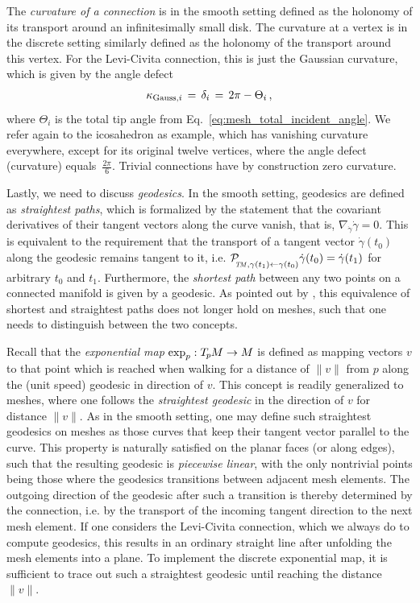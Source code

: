 The \emph{curvature of a connection} is in the smooth setting defined as the holonomy of its transport around an infinitesimally small disk.
The curvature at a vertex is in the discrete setting similarly defined as the holonomy of the transport around this vertex.
For the Levi-Civita connection, this is just the Gaussian curvature, which is given by the angle defect
\begin{align}
    \kappa_{\textup{Gauss},i} \,=\, \delta_i \,=\, 2\pi - \Theta_i \,,
\end{align}
where $\Theta_i$ is the total tip angle from Eq.~\eqref{eq:mesh_total_incident_angle}.
We refer again to the icosahedron as example, which has vanishing curvature everywhere, except for its original twelve vertices, where the angle defect (curvature) equals~$\frac{2\pi}{6}$.
Trivial connections have by construction zero curvature.


Lastly, we need to discuss \emph{geodesics}.
In the smooth setting, geodesics are defined as \emph{straightest paths}, which is formalized by the statement that the covariant derivatives of their tangent vectors along the curve vanish, that is, $\nabla_{\dot{\gamma}} \dot{\gamma} = 0$.
This is equivalent to the requirement that the transport of a tangent vector $\dot{\gamma}(t_0)$ along the geodesic remains tangent to it, i.e.
$\mathcal{P}_{\mkern-2mu\overset{}{\protect\scalebox{.6}{$\!T\!M$}, \gamma(t_1) \leftarrow \gamma(t_0)}}
 \dot{\gamma}(t_0) = \dot{\gamma}(t_1)$
for arbitrary $t_0$ and $t_1$.
Furthermore, the \emph{shortest path} between any two points on a connected manifold is given by a geodesic.
As pointed out by \citet{polthier1998straightest}, this equivalence of shortest and straightest paths does not longer hold on meshes, such that one needs to distinguish between the two concepts.


Recall that the \emph{exponential map} $\exp_p: T_{\mkern-1.5mu p}\mkern-.5muM \to M$ is defined as mapping vectors $v$ to that point which is reached when walking for a distance of $\lVert v\rVert$ from $p$ along the (unit speed) geodesic in direction of $v$.
This concept is readily generalized to meshes, where one follows the \emph{straightest geodesic} in the direction of $v$ for distance $\lVert v\rVert$.
As in the smooth setting, one may define such straightest geodesics on meshes as those curves that keep their tangent vector parallel to the curve.
This property is naturally satisfied on the planar faces (or along edges), such that the resulting geodesic is \emph{piecewise linear}, with the only nontrivial points being those where the geodesics transitions between adjacent mesh elements.
The outgoing direction of the geodesic after such a transition is thereby determined by the connection, i.e. by the transport of the incoming tangent direction to the next mesh element.
If one considers the Levi-Civita connection, which we always do to compute geodesics, this results in an ordinary straight line after unfolding the mesh elements into a plane.
To implement the discrete exponential map, it is sufficient to trace out such a straightest geodesic until reaching the distance $\lVert v\rVert$.


